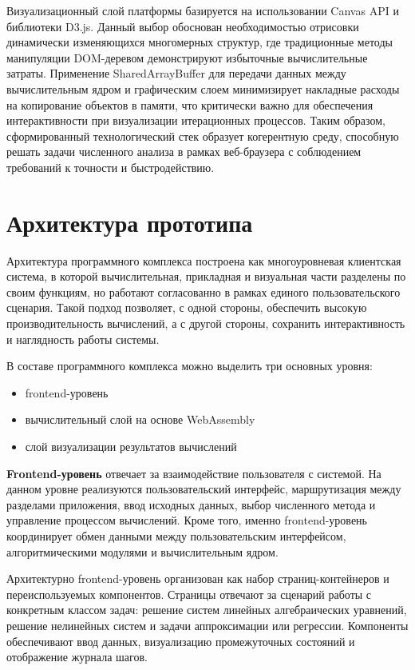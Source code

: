 \documentclass[12pt, oneside]{book}
\begin{document}
    \quad Визуализационный слой платформы базируется на использовании Canvas API и библиотеки D3.js. Данный выбор обоснован необходимостью отрисовки динамически изменяющихся многомерных структур, где традиционные методы манипуляции DOM-деревом демонстрируют избыточные вычислительные затраты. Применение SharedArrayBuffer для передачи данных между вычислительным ядром и графическим слоем минимизирует накладные расходы на копирование объектов в памяти, что критически важно для обеспечения интерактивности при визуализации итерационных процессов. Таким образом, сформированный технологический стек образует когерентную среду, способную решать задачи численного анализа в рамках веб-браузера с соблюдением требований к точности и быстродействию.

\section{Архитектура прототипа}

    \quad Архитектура программного комплекса построена как многоуровневая клиентская система, в которой вычислительная, прикладная и визуальная части разделены по своим функциям, но работают согласованно в рамках единого пользовательского сценария. Такой подход позволяет, с одной стороны, обеспечить высокую производительность вычислений, а с другой стороны, сохранить интерактивность и наглядность работы системы.

    \quad В составе программного комплекса можно выделить три основных уровня:
    \begin{itemize}
        \item frontend-уровень
        \item вычислительный слой на основе WebAssembly
        \item слой визуализации результатов вычислений
    \end{itemize}

    \quad \textbf{Frontend-уровень} отвечает за взаимодействие пользователя с системой. На данном уровне реализуются пользовательский интерфейс, маршрутизация между разделами приложения, ввод исходных данных, выбор численного метода и управление процессом вычислений. Кроме того, именно frontend-уровень координирует обмен данными между пользовательским интерфейсом, алгоритмическими модулями и вычислительным ядром.

    \quad Архитектурно frontend-уровень организован как набор страниц-контейнеров и переиспользуемых компонентов. Страницы отвечают за сценарий работы с конкретным классом задач: решение систем линейных алгебраических уравнений, решение нелинейных систем и задачи аппроксимации или регрессии. Компоненты обеспечивают ввод данных, визуализацию промежуточных состояний и отображение журнала шагов.
    
\end{document}
